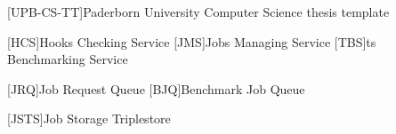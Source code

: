 \theoremstyle{plain}
\newtheorem{definition}{Definition}[chapter]
\newtheorem{lemma}[definition]{Lemma}
\ifgerman
	\newtheorem{theorem}[definition]{Satz}
	\newtheorem{corollary}[definition]{Korollar}
	\newtheorem{example}[definition]{Beispiel}
\else
	\newtheorem{theorem}[definition]{Theorem}
	\newtheorem{corollary}[definition]{Corollary}
	\newtheorem{example}[definition]{Example}
\fi



\newcommand*{\eg}{e.\,g.}
\newcommand*{\ie}{i.\,e.}
\newcommand*{\cf}{c.\,f.}
\newcommand*{\etal}{et~al.}

[UPB-CS-TT]{Paderborn University Computer Science thesis template}

\DeclareMathOperator{\testop}{top}


\newcommand*{\ts}{\acl*{ts}}
\newcommand*{\tsp}{\aclp*{ts}}
\newcommand*{\iguana}{\textsc{Iguana}}

\newcommand*{\gh}{GitHub}
\newcommand*{\dockh}{Docker Hub}

[HCS]{Hooks Checking Service}
[JMS]{Jobs Managing Service}
[TBS]{\ts{} Benchmarking Service}

[JRQ]{Job Request Queue}
[BJQ]{Benchmark Job Queue}

[JSTS]{Job Storage Triplestore}


\lstset{
	basicstyle=\scriptsize\ttfamily,
	numbers=left
}